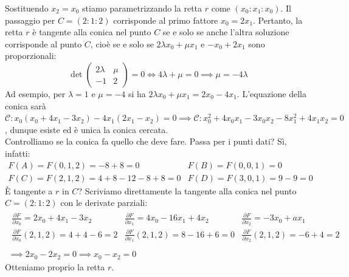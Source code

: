 \begin{solution}
\begin{equation*}
		\end{equation*}
	Sostituendo $x_2=x_0$ stiamo parametrizzando la retta $r$ come $(x_0\colon x_1\colon x_0)$. Il passaggio per $C=(2\colon1\colon2)$ corrisponde al primo fattore $x_0=2x_1$. Pertanto, la retta $r$ è tangente alla conica nel punto $C$ se e solo se anche l'altra soluzione corrisponde al punto $C$, cioè se e solo se $2\lambda x_0 +\mu x_1$ e $-x_0+2x_1$ sono proporzionali:
	\begin{equation*}
		\det \begin{pmatrix}
			2\lambda & \mu \\
			-1 & 2
		\end{pmatrix} =0 \iff 4\lambda +\mu=0 \implies \mu=-4\lambda
	\end{equation*}
	Ad esempio, per $\lambda=1$ e $\mu=-4$ si ha $2\lambda x_0+\mu x_1=2x_0-4x_1$. L'equazione della conica sarà $\mathcal{C} \colon x_0(x_0+4x_1-3x_2) -4x_1(2x_1-x_2)=0 \implies \mathcal{C}\colon x_0^2 +4x_0x_1 -3x_0x_2 -8x_1^2 +4x_1x_2=0$, dunque esiste ed è unica la conica cercata.\\
	Controlliamo se la conica fa quello che deve fare. Passa per i punti dati? Sì, infatti:
	\begin{equation*}
		\begin{array}{ll}
			F(A)=F(0,1,2)=-8+8=0 & F(B)=F(0,0,1)=0 \\
			F(C)=F(2,1,2)= 4+8-12-8+8 =0 & F(D)=F(3,0,1)=9-9=0
		\end{array}
	\end{equation*}
	È tangente a $r$ in $C$? Scriviamo direttamente la tangente alla conica nel punto $C=(2\colon1\colon2)$ con le derivate parziali:
		\begin{gather*}
			\begin{array}{lll}
				\frac{\partial{F}}{\partial{x_0}} = 2x_0+4x_1-3x_2 & \frac{\partial{F}}{\partial{x_1}} = 4x_0-16 x_1 +4x_2 & \frac{\partial{F}}{\partial{x_2}} = -3x_0 +ax_1\\
				\frac{\partial{F}}{\partial{x_0}} (2,1,2) =4+4-6=2 & \frac{\partial{F}}{\partial{x_1}} (2,1,2) =8-16+6=0 & \frac{\partial{F}}{\partial{x_2}} (2,1,2) = -6+4=2\\
			\end{array}\\
			\implies 2x_0-2x_2=0 \implies x_0-x_2=0
		\end{gather*}
	Otteniamo proprio la retta $r$.
\end{solution}
